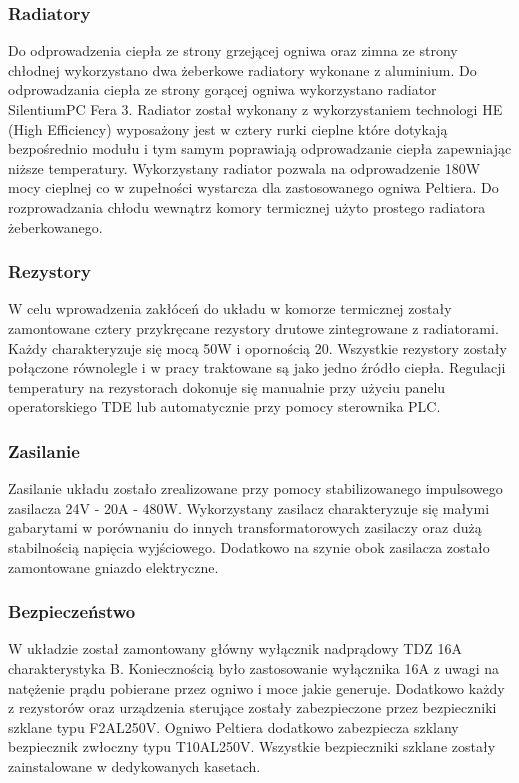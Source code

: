 \documentclass[oneside]{mgr}
\begin{document}
\subsubsection{Radiatory}
Do odprowadzenia ciepła ze strony grzejącej ogniwa oraz zimna ze strony chłodnej wykorzystano dwa żeberkowe radiatory wykonane z aluminium. Do odprowadzania ciepła ze strony gorącej ogniwa wykorzystano radiator SilentiumPC Fera 3. Radiator został wykonany z wykorzystaniem technologi HE (High Efficiency) wyposażony jest w cztery rurki cieplne które dotykają bezpośrednio modułu i tym samym poprawiają odprowadzanie ciepła zapewniając niższe temperatury. Wykorzystany radiator pozwala na odprowadzenie 180W mocy cieplnej co w zupełności wystarcza dla zastosowanego ogniwa Peltiera. Do rozprowadzania chłodu wewnątrz komory termicznej użyto prostego radiatora żeberkowanego. 
\subsubsection{Rezystory}
W celu wprowadzenia zakłóceń do układu w komorze termicznej zostały zamontowane cztery przykręcane rezystory drutowe zintegrowane z radiatorami. Każdy charakteryzuje się mocą 50W i opornością 20\ohm. Wszystkie rezystory zostały połączone równolegle i w pracy traktowane są jako jedno źródło ciepła. Regulacji temperatury na rezystorach dokonuje się manualnie przy użyciu panelu operatorskiego TDE lub automatycznie przy pomocy sterownika PLC.
\subsubsection{Zasilanie}
Zasilanie układu zostało zrealizowane przy pomocy stabilizowanego impulsowego zasilacza 24V - 20A - 480W. Wykorzystany zasilacz charakteryzuje się małymi gabarytami w porównaniu do innych transformatorowych zasilaczy oraz  dużą stabilnością napięcia wyjściowego. Dodatkowo na szynie obok zasilacza zostało zamontowane gniazdo elektryczne.
\subsubsection{Bezpieczeństwo}
W układzie został zamontowany główny wyłącznik nadprądowy TDZ 16A charakterystyka B. Koniecznością było zastosowanie wyłącznika 16A z uwagi na natężenie prądu pobierane przez ogniwo i moce jakie generuje. Dodatkowo każdy z rezystorów oraz urządzenia sterujące zostały zabezpieczone przez  bezpieczniki szklane typu F2AL250V. Ogniwo Peltiera dodatkowo zabezpiecza szklany bezpiecznik zwłoczny typu T10AL250V. Wszystkie bezpieczniki szklane zostały zainstalowane w dedykowanych kasetach.
\end{document}
